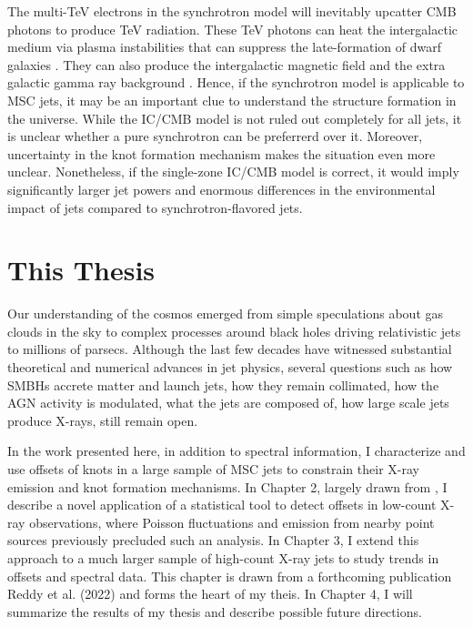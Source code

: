 The multi-TeV electrons in the synchrotron model will inevitably upcatter CMB photons to produce TeV radiation. These TeV photons can heat the intergalactic medium via plasma instabilities \citep[e.g.,][]{broderick2012cosmological,chang2012cosmological} that can suppress the late-formation of dwarf galaxies \citep{pfrommer2012cosmological}. They can also produce the intergalactic magnetic field and the extra galactic gamma ray background \citep{broderick2012cosmological,blandford2019relativistic}. Hence, if the synchrotron model is applicable to MSC jets, it may be an important clue to understand the structure formation in the universe. While the IC/CMB model is not ruled out completely for all jets, it is unclear whether a pure synchrotron can be preferrerd over it. Moreover, uncertainty in the knot formation mechanism makes the situation even more unclear. Nonetheless, if the single-zone IC/CMB model is correct, it would imply significantly larger jet powers and enormous differences in the environmental impact of jets compared to synchrotron-flavored jets.

\section{This Thesis}
Our understanding of the cosmos emerged from simple speculations about gas clouds in the sky to complex processes around black holes driving relativistic jets to millions of parsecs. Although the last few decades have witnessed substantial theoretical and numerical advances in jet physics, several questions such as how SMBHs accrete matter and launch jets, how they remain collimated, how the AGN activity is modulated, what the jets are composed of, how large scale jets produce X-rays, still remain open. 

In the work presented here, in addition to spectral information, I characterize and use offsets of knots in a large sample of MSC jets to constrain their X-ray emission and knot formation mechanisms. In Chapter 2, largely drawn from \citet{2021ApJS..253...37R}, I describe a novel application of a statistical tool to detect offsets in low-count X-ray observations, where Poisson fluctuations and emission from nearby point sources previously precluded such an analysis. In Chapter 3, I extend this approach to a much larger sample of high-count X-ray jets to study trends in offsets and spectral data. This chapter is drawn from a forthcoming publication Reddy et al. (2022) and forms the heart of my theis. In Chapter 4, I will summarize the results of my thesis and describe possible future directions.












